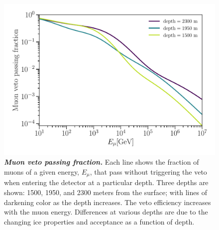 \begin{figure}
	\centering
	\includegraphics[width=\linewidth]{figures/hese_paper/plight}
	\internallinenumbers
	\caption{\textbf{\textit{Muon veto passing fraction.}} Each line shows the fraction of muons of a given energy, $E_\mu$, that pass without triggering the veto when entering the detector at a particular depth.
		Three depths are shown: 1500, 1950, and 2300 meters from the surface; with lines of darkening color as the depth increases.
		The veto efficiency increases with the muon energy.
		Differences at various depths are due to the changing ice properties and acceptance as a function of depth.}\label{fig:P_light}
\end{figure}

